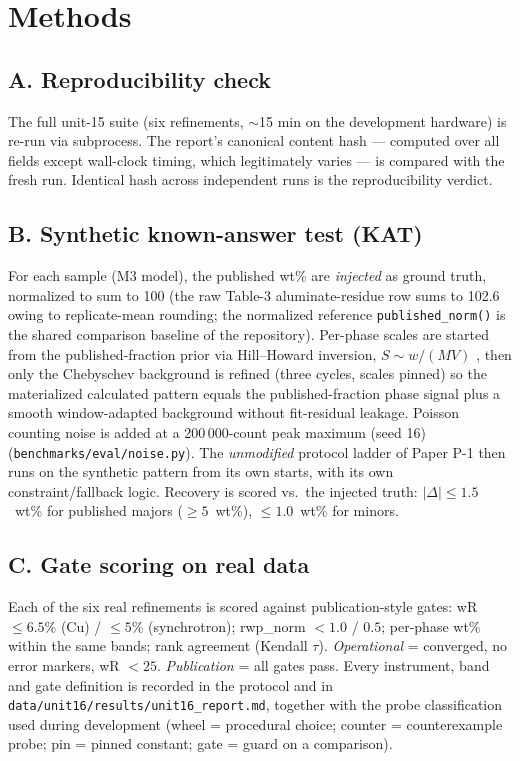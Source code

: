 \documentclass[11pt,a4paper]{article}
\begin{document}
\section{Methods}
\subsection{A. Reproducibility check}
The full unit-15 suite (six refinements, $\sim$15 min on the development
hardware) is re-run via subprocess. The report's canonical content hash
--- computed over all fields except wall-clock timing, which legitimately
varies --- is compared with the fresh run. Identical hash across
independent runs is the reproducibility verdict.

\subsection{B. Synthetic known-answer test (KAT)}
For each sample (M3 model), the published wt\% are \emph{injected} as
ground truth, normalized to sum to 100 (the raw Table-3 aluminate-residue
row sums to 102.6 owing to replicate-mean rounding; the normalized
reference \texttt{published\_norm()} is the shared comparison baseline of
the repository). Per-phase scales are started from the published-fraction
prior via Hill--Howard inversion, $S \sim w/(MV)$
\cite{hill1987normalization}, then only the Chebyschev background is
refined (three cycles, scales pinned) so the materialized calculated
pattern equals the published-fraction phase signal plus a smooth
window-adapted background without fit-residual leakage. Poisson counting
noise is added at a 200\,000-count peak maximum (seed 16)
(\texttt{benchmarks/eval/noise.py}). The \emph{unmodified} protocol
ladder of Paper P-1 then runs on the synthetic pattern from its own
starts, with its own constraint/fallback logic. Recovery is scored vs.\
the injected truth: $|\Delta| \le 1.5$~wt\% for published majors
($\ge 5$~wt\%), $\le 1.0$~wt\% for minors.

\subsection{C. Gate scoring on real data}
Each of the six real refinements is scored against publication-style
gates: wR $\le 6.5$\% (Cu) / $\le 5$\% (synchrotron);
rwp\_norm $< 1.0$ / $0.5$; per-phase wt\% within the same bands; rank
agreement (Kendall $\tau$). \emph{Operational} = converged, no error
markers, wR $< 25$. \emph{Publication} = all gates pass. Every instrument,
band and gate definition is recorded in the protocol and in
\texttt{data/unit16/results/unit16\_report.md}, together with the
probe classification used during development (wheel = procedural choice;
counter = counterexample probe; pin = pinned constant;
gate = guard on a comparison).
\end{document}
